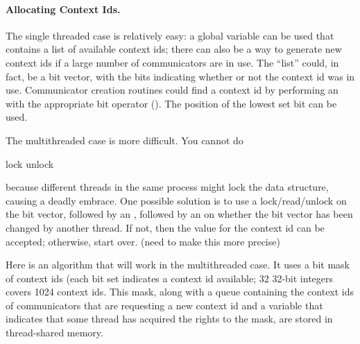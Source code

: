 \documentclass{article}
\begin{document}
\paragraph{Allocating Context Ids.}
The single threaded case is relatively easy: a global variable can be used
that contains a list of available context ids; there can also be a way to
generate new context ids if a large number of communicators are in use.  The
``list'' could, in fact, be a bit vector, with the bits indicating whether or
not the context id was in use.  Communicator creation routines could find a
context id by performing an  with the appropriate bit
operator ().  The position of the lowest set bit can be
used.  

The multithreaded case is more difficult.  You cannot do
\begin{algorithm}
  lock
  unlock
\end{algorithm}
\noindent 
because different threads in the same process might lock the data structure,
causing a deadly embrace.
One possible solution is to use a lock/read/unlock on the bit vector, followed
by an , followed by an  on
whether the bit vector has been changed by another thread.  If not, then the
value for the context id can be accepted; otherwise, start over.  (need to
make this more precise)

Here is an algorithm that will work in the multithreaded case.  It
uses a bit mask of context ids (each bit set indicates a context id
available; 32 32-bit integers covers 1024 context ids.  This mask,
along with a queue containing the context ids of communicators that
are requesting a new context id and a variable that indicates that
some thread has acquired the rights to the mask, are stored in
thread-shared memory.
\end{document}
